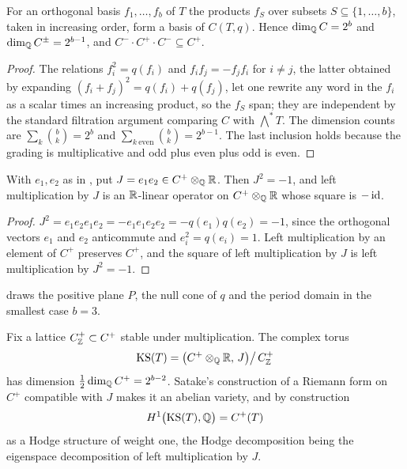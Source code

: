 \begin{lemma}\label{lem:cliffdim}
For an orthogonal basis $f_{1},\dots,f_{b}$ of $T$ the products $f_{S}$ over
subsets $S\subseteq\{1,\dots,b\}$, taken in increasing order, form a basis of
$C(T,q)$. Hence $\dim_{\mathbb{Q}}C=2^{b}$ and $\dim_{\mathbb{Q}}C^{\pm}=2^{b-1}$, and
$C^{-}\cdot C^{+}\cdot C^{-}\subseteq C^{+}$.
\end{lemma}

\begin{proof}
The relations $f_{i}^{2}=q(f_{i})$ and $f_{i}f_{j}=-f_{j}f_{i}$ for $i\ne j$,
the latter obtained by expanding $(f_{i}+f_{j})^{2}=q(f_{i})+q(f_{j})$, let one
rewrite any word in the $f_{i}$ as a scalar times an increasing product, so the
$f_{S}$ span; they are independent by the standard filtration argument
comparing $C$ with $\bigwedge^{*}T$. The dimension counts are
$\sum_{k}\binom{b}{k}=2^{b}$ and
$\sum_{k\ \mathrm{even}}\binom{b}{k}=2^{b-1}$. The last inclusion holds
because the grading is multiplicative and odd plus even plus odd is even.
\end{proof}

\begin{lemma}\label{lem:cliffJ}
With $e_{1},e_{2}$ as in , put $J=e_{1}e_{2}\in C^{+}\otimes_{\mathbb{Q}}\mathbb{R}$.
Then $J^{2}=-1$, and left multiplication by $J$ is an $\mathbb{R}$-linear operator on
$C^{+}\otimes_{\mathbb{Q}}\mathbb{R}$ whose square is $-\operatorname{id}$.
\end{lemma}

\begin{proof}
$J^{2}=e_{1}e_{2}e_{1}e_{2}=-e_{1}e_{1}e_{2}e_{2}=-q(e_{1})q(e_{2})=-1$,
since the orthogonal vectors $e_{1}$ and $e_{2}$ anticommute and
$e_{i}^{2}=q(e_{i})=1$.
Left multiplication by an element of $C^{+}$ preserves $C^{+}$, and the square
of left multiplication by $J$ is left multiplication by $J^{2}=-1$.
\end{proof}

 draws the positive plane $P$, the null cone of $q$ and the
period domain in the smallest case $b=3$.

\begin{definition}\label{def:ksvariety}
Fix a lattice $C^{+}_{\mathbb{Z}}\subset C^{+}$ stable under multiplication. The
complex torus
\[
  \mathrm{KS}(T)=\bigl(C^{+}\otimes_{\mathbb{Q}}\mathbb{R},\,J\bigr)\big/\,C^{+}_{\mathbb{Z}}
\]
has dimension $\tfrac12\dim_{\mathbb{Q}}C^{+}=2^{b-2}$. Satake's construction of a
Riemann form on $C^{+}$ compatible with $J$ \cite{Sat66} makes it an abelian
variety, and by construction
\[
  H^{1}\bigl(\mathrm{KS}(T),\mathbb{Q}\bigr)=C^{+}(T)
\]
as a Hodge structure of weight one, the Hodge decomposition being the
eigenspace decomposition of left multiplication by $J$.
\end{definition}

